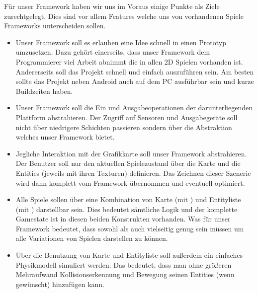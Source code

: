 Für unser Framework haben wir uns im Voraus einige Punkte als Ziele zurechtgelegt. Dies sind vor allem Features welche uns von vorhandenen Spiele Frameworks unterscheiden sollen.

\begin{itemize}
	\item {}
	
Unser Framework soll es erlauben eine Idee schnell in einen Prototyp umzusetzen. Dazu gehört einerseits, dass unser Framework dem Programmierer viel Arbeit abnimmt die in allen 2D Spielen vorhanden ist. Andererseits soll das Projekt schnell und einfach auszuführen sein. Am besten sollte das Projekt neben Android auch auf dem PC ausführbar sein und kurze Buildzeiten haben.

	\item {}
	
Unser Framework soll die Ein und Ausgabeoperationen der darunterliegenden Plattform abstrahieren. Der Zugriff auf Sensoren und Ausgabegeräte soll nicht über niedrigere Schichten passieren sondern über die Abstraktion welches unser Framework bietet.

	\item {}
	
Jegliche Interaktion mit der Grafikkarte soll unser Framework abstrahieren. Der Benutzer soll nur den aktuellen Spielezustand  über die Karte und die Entities (jeweils mit ihren Texturen) definieren. Das Zeichnen dieser Szenerie wird dann komplett vom Framework übernommen und eventuell optimiert.

	\item {} 
	
Alle Spiele sollen über eine Kombination von Karte (mit ) und Entityliste (mit ) darstellbar sein. Dies bedeutet sämtliche Logik und der komplette Gamestate ist in diesen beiden Konstrukten vorhanden. Was für unser Framework bedeutet, dass sowohl  als auch  vielseitig genug sein müssen um alle Variationen von Spielen darstellen zu können.

	\item {} 
	
Über die Benutzung von Karte und Entityliste soll außerdem ein einfaches Physikmodell simuliert werden. Das bedeutet, dass man ohne größeren Mehraufwand Kollisionserkennung und Bewegung seinen Entities (wenn gewünscht) hinzufügen kann.


\end{itemize}
